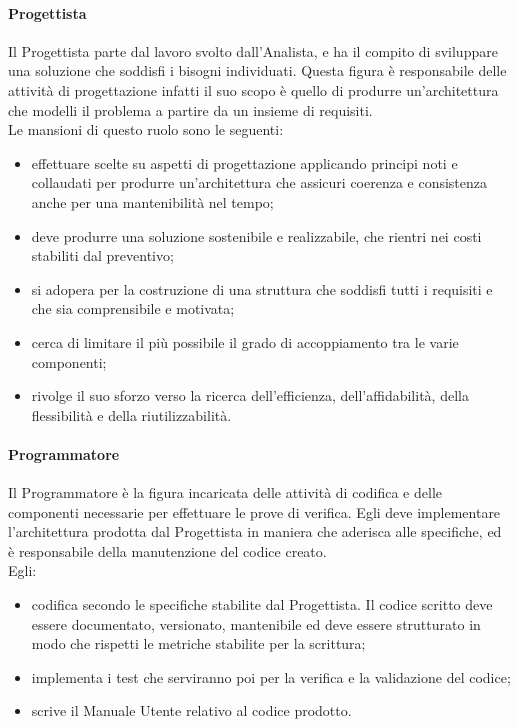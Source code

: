             \paragraph{Progettista }
                Il Progettista parte dal lavoro svolto dall’Analista, e ha il compito di sviluppare una soluzione che soddisfi i bisogni individuati. Questa figura è responsabile delle attività di progettazione infatti il suo scopo è quello di produrre un’architettura che modelli il problema a partire da un insieme di requisiti. \\
                Le mansioni di questo ruolo sono le seguenti:\\
                \begin{itemize}
                    \item effettuare scelte su aspetti di progettazione applicando principi noti e collaudati per produrre un’architettura che assicuri coerenza e consistenza anche per una mantenibilità nel tempo;
                    \item deve produrre una soluzione sostenibile e realizzabile, che rientri nei costi stabiliti dal preventivo;
                    \item si adopera per la costruzione di una struttura che soddisfi tutti i requisiti e che sia comprensibile e motivata;
                    \item cerca di limitare il più possibile il grado di accoppiamento tra le varie componenti;
                    \item rivolge il suo sforzo verso la ricerca dell’efficienza, dell’affidabilità, della flessibilità e della riutilizzabilità.
                \end{itemize}
            \paragraph{Programmatore }
                Il Programmatore è la figura incaricata delle attività di codifica e delle componenti necessarie per effettuare le prove di verifica. Egli deve implementare l’architettura prodotta dal Progettista in maniera che aderisca alle specifiche, ed è responsabile della manutenzione del codice creato. \\
                Egli:
                \begin{itemize}
                    \item codifica secondo le specifiche stabilite dal Progettista. Il codice scritto deve essere documentato, versionato, mantenibile ed deve essere strutturato in modo che rispetti le metriche stabilite per la scrittura;
                    \item implementa i test che serviranno poi per la verifica e la validazione del codice;
                    \item scrive il Manuale Utente relativo al codice prodotto.
                \end{itemize}
